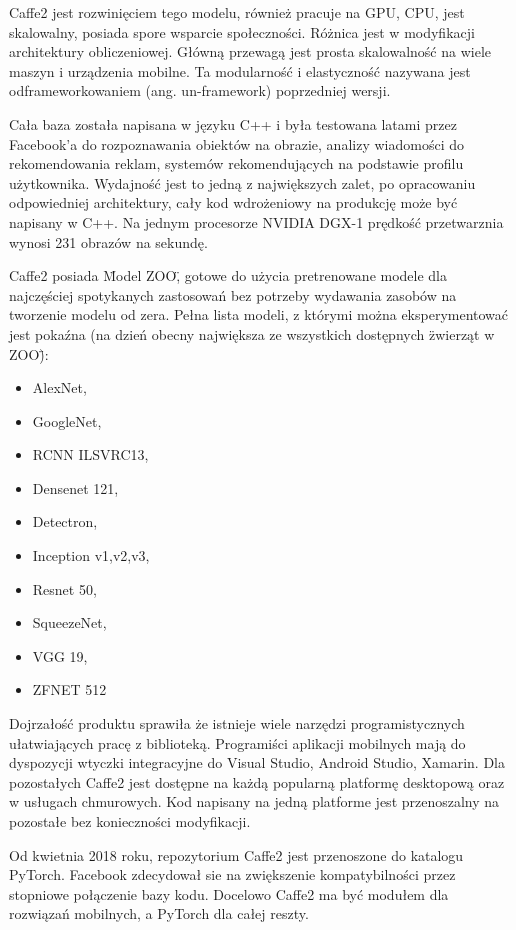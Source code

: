 \documentclass[12pt,a4paper,twoside,titlepage,openright]{book}
\begin{document}
Caffe2 jest rozwinięciem tego modelu, również pracuje na GPU, CPU, jest skalowalny, posiada spore wsparcie społeczności. Różnica jest w modyfikacji architektury obliczeniowej. Główną przewagą jest prosta skalowalność na wiele maszyn i urządzenia mobilne. Ta modularność i elastyczność nazywana jest odframeworkowaniem (ang. un-framework) poprzedniej wersji.
\cite{DBLP:journals/corr/JiaSDKLGGD14}

Cała baza została napisana w języku C++ i była testowana latami przez Facebook'a do rozpoznawania obiektów na obrazie, analizy wiadomości do rekomendowania reklam, systemów rekomendujących na podstawie profilu użytkownika. Wydajność jest to jedną z największych zalet, po opracowaniu odpowiedniej architektury, cały kod wdrożeniowy na produkcję może być napisany w C++. Na jednym procesorze NVIDIA DGX-1 prędkość przetwarznia wynosi 231 obrazów na sekundę.\cite{NvidiaCaffe2(https://developer.nvidia.com/caffe2)}

Caffe2 posiada \"Model ZOO\", gotowe do użycia pretrenowane modele dla najczęściej spotykanych zastosowań bez potrzeby wydawania zasobów na tworzenie modelu od zera. Pełna lista modeli, z którymi można eksperymentować jest pokaźna (na dzień obecny największa ze wszystkich dostępnych \"zwierząt w ZOO\"):
\begin{itemize}
\item AlexNet,
\item GoogleNet,
\item RCNN ILSVRC13,
\item Densenet 121,
\item Detectron,
\item Inception v1,v2,v3,
\item Resnet 50,
\item SqueezeNet,
\item VGG 19,
\item ZFNET 512
\end{itemize}

Dojrzałość produktu sprawiła że istnieje wiele narzędzi programistycznych ułatwiających pracę z biblioteką. Programiści aplikacji mobilnych mają do dyspozycji wtyczki integracyjne do Visual Studio, Android Studio, Xamarin. Dla pozostałych Caffe2 jest dostępne na każdą popularną platformę desktopową oraz w usługach chmurowych. Kod napisany na jedną platforme jest przenoszalny na pozostałe bez konieczności modyfikacji.

Od kwietnia 2018 roku, repozytorium Caffe2 jest przenoszone do katalogu PyTorch. Facebook zdecydował sie na zwiększenie kompatybilności przez stopniowe połączenie bazy kodu. Docelowo Caffe2 ma być modułem dla rozwiązań mobilnych, a PyTorch dla całej reszty.
\end{document}
